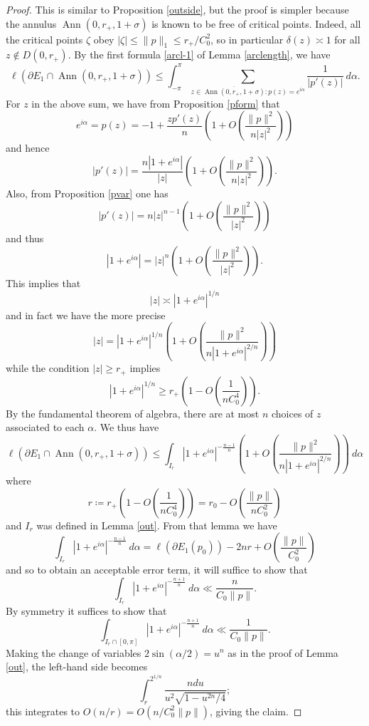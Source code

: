 \documentclass[12pt]{amsart}
\newcommand{\Ann}{\operatorname{Ann}}
\begin{document}
\begin{proof}  This is similar to Proposition \ref{outside}, but the proof is simpler because the annulus $\Ann(0,r_+,1+\sigma)$ is known to be free of critical points.
Indeed, all the critical points $\zeta$ obey $|\zeta| \leq \|p\|_1 \leq r_+/C_0^2$, so in particular $\delta(z) \asymp 1$ for all $z \notin D(0,r_+)$.  By the first formula \eqref{arcl-1} of Lemma \ref{arclength}, we have
$$ \ell(\partial E_1 \cap \Ann(0,r_+,1+\sigma)) \leq \int_{-\pi}^{\pi} \sum_{z \in \overline{\Ann(0,r_+,1+\sigma)}: p(z) = e^{i\alpha}} \frac{1}{|p'(z)|} \ d\alpha.$$
For $z$ in the above sum, we have from Proposition \ref{pform} that
$$ e^{i\alpha} = p(z) = -1 + \frac{zp'(z)}{n} \left( 1 + O\left(\frac{\|p\|^2}{n |z|^2} \right) \right)$$
and hence
$$ |p'(z)| = \frac{n |1 + e^{i\alpha}|}{|z|} \left( 1 + O\left(\frac{\|p\|^2}{n |z|^2} \right) \right).$$
Also, from Proposition \ref{pvar} one has
$$ |p'(z)| = n |z|^{n-1} \left( 1 + O\left(\frac{\|p\|^2}{|z|^2} \right) \right)$$
and thus
$$ |1+e^{i\alpha}| = |z|^n \left( 1 + O\left(\frac{\|p\|^2}{|z|^2} \right) \right).$$
This implies that
$$ |z| \asymp |1+e^{i\alpha}|^{1/n}$$
and in fact we have the more precise
$$ |z| = |1 + e^{i\alpha}|^{1/n} \left( 1 + O\left(\frac{\|p\|^2}{n |1+e^{i\alpha}|^{2/n}} \right) \right)$$
while the condition $|z| \geq r_+$ implies
$$ |1 + e^{i\alpha}|^{1/n} \geq r_+ \left( 1 - O\left(\frac{1}{n C_0^4} \right) \right).$$
By the fundamental theorem of algebra, there are at most $n$ choices of $z$ associated to each $\alpha$. We thus have
$$ \ell(\partial E_1 \cap \Ann(0,r_+,1+\sigma)) \leq \int_{I_r} |1 + e^{i\alpha}|^{-\frac{n-1}{n}} \left( 1 + O\left(\frac{\|p\|^2}{n |1+e^{i\alpha}|^{2/n}} \right) \right)\ d\alpha$$
where
$$r \coloneqq r_+ \left( 1 - O\left(\frac{1}{n C_0^4} \right) \right) = r_0 - O\left( \frac{\|p\|}{n C_0^2} \right)$$
and $I_r$ was defined in Lemma \ref{out}.  From that lemma we have
$$ \int_{I_r} |1 + e^{i\alpha}|^{-\frac{n-1}{n}}\ d\alpha = \ell(\partial E_1(p_0)) - 2n r + O\left( \frac{\|p\|}{C_0^2} \right)$$
and so to obtain an acceptable error term, it will suffice to show that
$$ \int_{I_r} |1 + e^{i\alpha}|^{-\frac{n+1}{n}}\ d\alpha \ll \frac{n}{C_0 \|p\|}.$$
By symmetry it suffices to show that
$$ \int_{I_r \cap [0,\pi]} |1 + e^{i\alpha}|^{-\frac{n+1}{n}}\ d\alpha \ll \frac{1}{C_0 \|p\|}.$$
Making the change of variables $2 \sin(\alpha/2) = u^n$ as in the proof of Lemma \ref{out}, the left-hand side becomes
$$ \int_r^{2^{1/n}} \frac{n du}{u^2 \sqrt{1 - u^{2n}/4}};$$
this integrates to $O(n/r) = O(n/C_0^2 \|p\|)$, giving the claim.
\end{proof}
\end{document}
